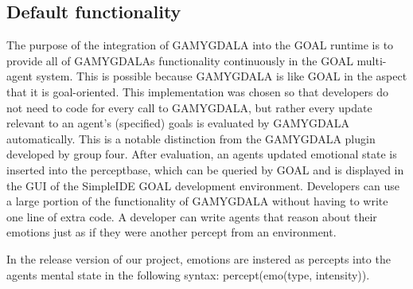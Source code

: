\documentclass[11pt]{article}
\begin{document}
\subsection{Default functionality}
The purpose of the integration of GAMYGDALA\cite{GAMYGDALA} into the GOAL runtime is to provide all of GAMYGDALAs functionality continuously in the GOAL multi-agent system. This is possible because GAMYGDALA is like GOAL in the aspect that it is goal-oriented. This implementation was chosen so that developers do not need to code for every call to GAMYGDALA, but rather every update relevant to an agent's (specified) goals is evaluated by GAMYGDALA automatically. This is a notable distinction from the GAMYGDALA plugin developed by group four. After evaluation, an agents updated emotional state is inserted into the perceptbase, which can be queried by GOAL and is displayed in the GUI of the SimpleIDE GOAL development environment. Developers can use a large portion of the functionality of GAMYGDALA without having to write one line of extra code. A developer can write agents that reason about their emotions just as if they were another percept from an environment.

In the release version of our project, emotions are instered as percepts into the agents mental state in the following syntax: percept(emo(type, intensity)).
\end{document}
